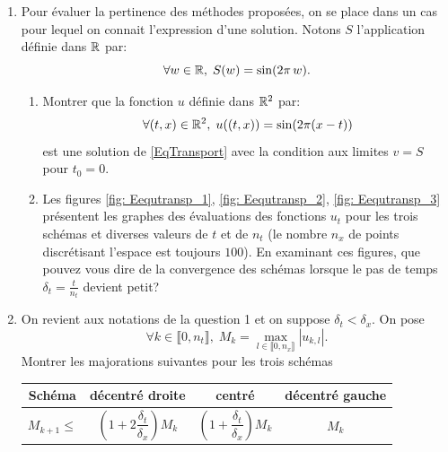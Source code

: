\begin{enumerate}
\item Pour évaluer la pertinence des méthodes proposées, on se place dans un cas pour lequel on connait l'expression d'une solution. Notons $S$ l'application définie dans $\mathbb{R}$ par:
\[
 \forall w\in \mathbb{R}, \; S(w) = \sin(2\pi\,w).
\]
\begin{enumerate}
 \item Montrer que la fonction $u$ définie dans $\mathbb{R}^2$ par:
\[
 \forall (t,x)\in \mathbb{R}^2, \; u((t,x)) = \sin(2\pi(x - t))
\]
est une solution de \ref{EqTransport} avec la condition aux limites $v = S$ pour $t_0=0$.
 \item Les figures \ref{fig: Eequtransp_1}, \ref{fig: Eequtransp_2}, \ref{fig: Eequtransp_3} présentent les graphes des évaluations des fonctions $u_t$ pour les trois schémas et diverses valeurs de $t$ et de $n_t$ (le nombre $n_x$ de points discrétisant l'espace est toujours $100$).\newline
 En examinant ces figures, que pouvez vous dire de la convergence des schémas lorsque le pas de temps $\delta_t = \frac{t}{n_t}$ devient petit?
\end{enumerate}

\item On revient aux notations de la question 1 et on suppose $\delta_t < \delta_x$. On pose
\[
 \forall k \in \llbracket 0, n_t\rrbracket, \; M_k = \max_{l \in \llbracket 0, n_x\rrbracket} \left| u_{k,l}\right|.
\]
Montrer les majorations suivantes pour les trois schémas
\begin{center}
\renewcommand{\arraystretch}{2.}
\begin{tabular}{|c|c|c|c|} \hline
Schéma        & décentré droite & centré & décentré gauche\\ \hline
$M_{k+1}\leq$ & $\left( 1+2\dfrac{\delta_t}{\delta_x}\right)M_k$  & $\left( 1 + \dfrac{\delta_t}{\delta_x}\right)M_k$ & $M_k$ \\ \hline
\end{tabular}
\end{center}

\end{enumerate}

